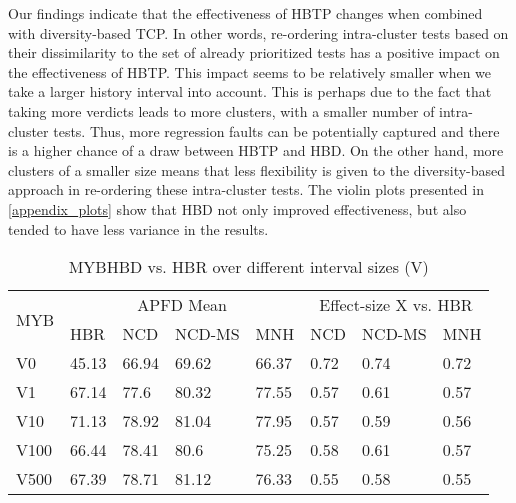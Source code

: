 \documentclass[1p]{elsarticle}
\begin{document}
Our findings indicate that the effectiveness of HBTP changes when combined with diversity-based TCP. In other words, re-ordering intra-cluster tests based on their dissimilarity to the set of already prioritized tests has a positive impact on the effectiveness of HBTP. This impact seems to be relatively smaller when we take a larger history interval into account. This is perhaps due to the fact that taking more verdicts leads to more clusters, with a smaller number of intra-cluster tests. Thus, more regression faults can be potentially captured and there is a higher chance of a draw between HBTP and HBD. On the other hand, more clusters of a smaller size means that less flexibility is given to the diversity-based approach in re-ordering these intra-cluster tests. The violin plots presented in \ref{appendix_plots} show that HBD not only improved effectiveness, but also tended to have less variance in the results.


\begin{table} [H]
\centering
\caption {MYB\textendash HBD vs. HBR over different interval sizes (V)}
\label{table:rq3_p1}
  \begin{tabular}{|l|l|l|l|l|l|l|l|}
    \hline
    \multirow{2}{*}{MYB} &
      \multicolumn{4}{c|}{APFD Mean} &
      \multicolumn{3}{c|}{Effect-size X vs. HBR} \\
    & HBR & NCD & NCD-MS & MNH & NCD & NCD-MS & MNH \\
    \hline
    \hline
    V0&45.13&66.94&69.62&66.37&0.72\cellcolor{Gray}&0.74\cellcolor{Gray}&0.72\cellcolor{Gray}\\
	\hline
	V1&67.14&77.6&80.32&77.55&0.57&0.61&0.57\\
	\hline
	V10&71.13&78.92&81.04&77.95&0.57&0.59&0.56\\
	\hline
	V100&66.44&78.41&80.6&75.25&0.58&0.61\cellcolor{Gray}&0.57\\
	\hline
	V500&67.39&78.71&81.12&76.33&0.55&0.58\cellcolor{Gray}&0.55\\
	\hline
  \end{tabular}
\end{table}
\end{document}
